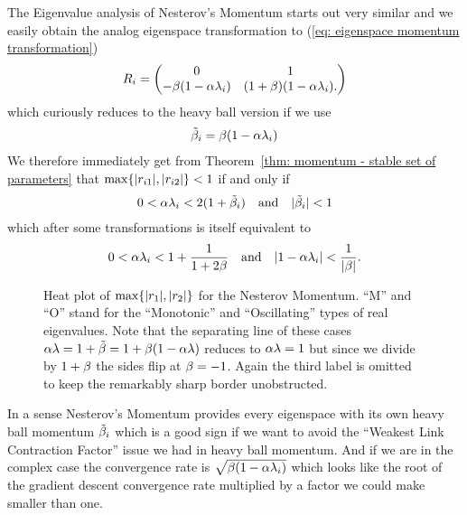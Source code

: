 The Eigenvalue analysis of Nesterov's Momentum starts out very similar and we
easily obtain the analog eigenspace transformation to (\ref{eq: eigenspace
momentum transformation})
%
\begin{align*}
	R_i = \begin{pmatrix}
		0 & 1\\
		-\beta(1-\alpha\lambda_i) & (1+\beta)(1-\alpha\lambda_i).
	\end{pmatrix}	
\end{align*}
%
which curiously reduces to the heavy ball version if we use
\begin{align}\label{eq: tilde momentum}
	\tilde{\beta}_i = \beta(1-\alpha\lambda_i)
\end{align}
We therefore immediately get from Theorem~\ref{thm: momentum - stable set of
parameters} that \(\max\{|r_{i1}|,|r_{i2}|\}<1\) if and only if
\begin{align*}
	0<\alpha\lambda_i < 2(1+\tilde{\beta}_i)
	\quad \text{and} \quad
	|\tilde{\beta}_i|<1
\end{align*}
%
which after some transformations is itself equivalent to
\begin{align*}
	0<\alpha\lambda_i < 1+\frac{1}{1+2\beta}
	\quad \text{and} \quad
	|1-\alpha\lambda_i|<\frac{1}{|\beta|}.
\end{align*}
%
\begin{figure}[h]
	\centering
	\def\svgwidth{1\textwidth}
	
	\caption{
		Heat plot of \(\max\{|r_1|,|r_2|\}\) for the Nesterov Momentum.
		``M'' and ``O'' stand for the ``Monotonic'' and ``Oscillating'' types of 
		real eigenvalues. Note that the separating line of these cases
		\(\alpha\lambda=1+\tilde{\beta}=1+\beta(1-\alpha\lambda)\)
		reduces to \(\alpha\lambda=1\) but since we divide by \(1+\beta\)
		the sides flip at \(\beta=-1\). Again the third label is omitted to
		keep the remarkably sharp border unobstructed.
	}
	\label{fig: annotated nesterov rates}
\end{figure}

In a sense Nesterov's Momentum provides every eigenspace with its own
heavy ball momentum \(\tilde{\beta}_i\) which is a good sign if we want
to avoid the ``Weakest Link Contraction Factor'' issue we had in heavy ball
momentum. And if we are in the complex case the convergence rate is
\(\sqrt{\beta(1-\alpha\lambda_i)}\) which looks like the root of the
gradient descent convergence rate multiplied by a factor we could make smaller
than one.


